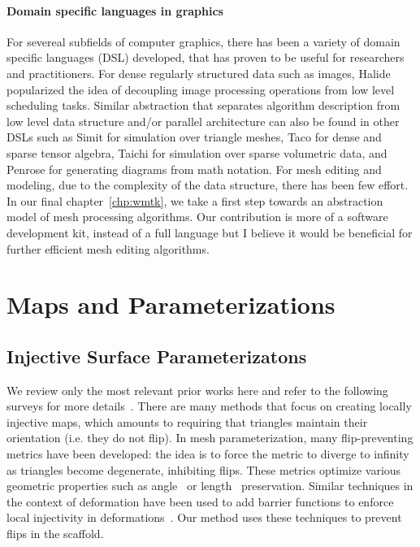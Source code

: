 \paragraph{Domain specific languages in graphics}
For severeal subfields of computer graphics, there has been a variety of domain
specific languages (DSL) developed, that has proven to be useful for researchers and practitioners. For dense regularly structured data such
as images, Halide \cite{ragan2013halide} popularized the idea of decoupling image
processing operations from low level scheduling tasks. Similar abstraction that
separates algorithm description from low level data structure and/or parallel
architecture can also be found in other DSLs such as Simit
\cite{kjolstad2016simit} for simulation over triangle meshes, Taco
\cite{kjolstad2017taco} for dense and sparse tensor algebra, Taichi
\cite{hu2019taichi} for simulation over sparse volumetric data, and Penrose
\cite{ye2020penrose} for generating diagrams from math notation.
For mesh editing and modeling, due to the complexity of the data structure, there has been few effort.
In our final chapter~\ref*{chp:wmtk}, we take a first step towards an abstraction model of mesh processing algorithms. Our contribution is more of a software development kit, instead of a full language but I believe it would be beneficial for further efficient mesh editing algorithms.

\section{Maps and Parameterizations}

\subsection*{Injective Surface Parameterizatons}
We review only the most relevant prior works here and refer to the following surveys for more details~\cite{FloaterSurvey:2005,Sheffer:2006,Hormann:2007}.
 There are many methods that focus on creating locally injective maps, which amounts to requiring that triangles maintain their orientation (i.e. they do not flip). In mesh parameterization, many flip-preventing metrics have been developed: the idea is to force the metric to diverge to infinity as triangles become degenerate, inhibiting flips.  These metrics optimize various geometric properties such as angle~\cite{hormann2000mips,Degener:2003} or length~\cite{Sander:2001,Sorkine:2002,Aigerman:2014,Poranne:2014,Smith:2015} preservation.  Similar techniques in the context of deformation have been used to add barrier functions to enforce local injectivity in deformations~\cite{Schuller:2013}. Our method uses these techniques to prevent flips in the scaffold.

